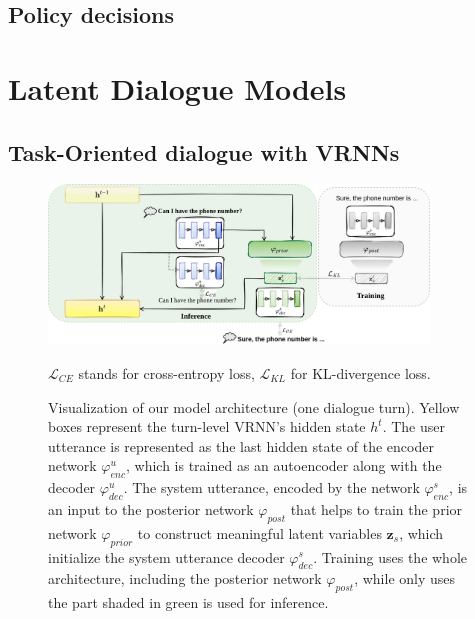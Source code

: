 \subsection{Policy decisions}
\section{Latent Dialogue Models}

\subsection{Task-Oriented dialogue with VRNNs}
\begin{figure}[t]
    \centering
    \includegraphics[width=0.9\textwidth]{images/vrnn-paper.png}
    \caption{Visualization of our model architecture (one dialogue turn). Yellow boxes represent the turn-level VRNN's hidden state $h^t$. The user utterance is represented as the last hidden state of the encoder network $\varphi_{enc}^u$, which is trained as an autoencoder along with the decoder $\varphi_{dec}^u$. The system utterance, encoded by the network $\varphi_{enc}^s$, is an input to the posterior network $\varphi_{post}$ that helps to train the prior network $\varphi_{prior}$ to construct meaningful latent variables $\mathbf{z}_s$, which initialize the system utterance decoder $\varphi_{dec}^s$. Training uses the whole architecture, including the posterior network $\varphi_{post}$, while only uses the part shaded in green is used for inference.} $\mathcal{L}_{CE}$ stands for cross-entropy loss, $\mathcal{L}_{KL}$ for KL-divergence loss.
    \label{fig:vrnn_method}
\end{figure}


